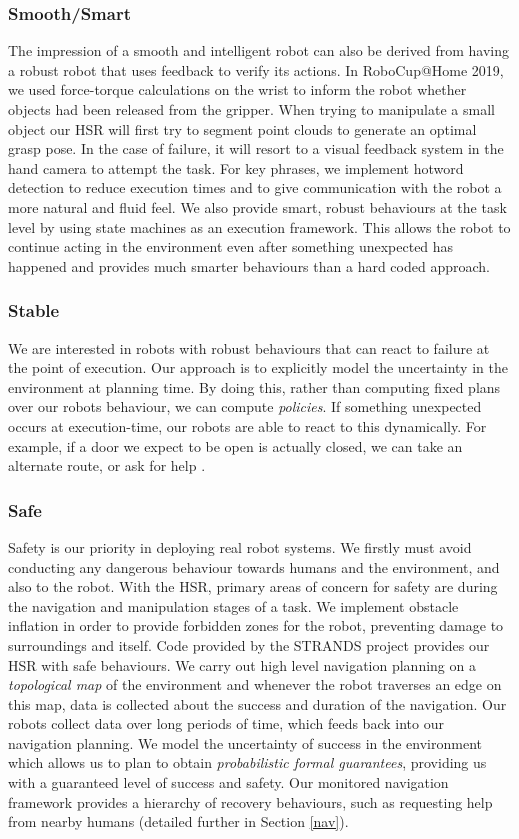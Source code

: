 \documentclass[runningheads,a4paper]{llncs}
\begin{document}
\subsubsection{Smooth/Smart}
The impression of a smooth and intelligent robot can also be derived from having a robust robot that uses feedback to verify its actions. In RoboCup@Home 2019, we used force-torque calculations on the wrist to inform the robot whether objects had been released from the gripper. When trying to manipulate a small object our HSR will first try to segment point clouds to generate an optimal grasp pose. In the case of failure, it will resort to a visual feedback system in the hand camera to attempt the task. For key phrases, we implement hotword detection to reduce execution times and to give communication with the robot a more natural and fluid feel. We also provide smart, robust behaviours at the task level by using state machines as an execution framework. This allows the robot to continue acting in the environment even after something unexpected has happened and provides much smarter behaviours than a hard coded approach.

\subsubsection{Stable}
We are interested in robots with robust behaviours that can react to failure at the point of execution. Our approach is to explicitly model the uncertainty in the environment at planning time. By doing this, rather than computing fixed plans over our robots behaviour, we can compute \emph{policies}. If something unexpected occurs at execution-time, our robots are able to react to this dynamically. For example, if a door we expect to be open is actually closed, we can take an alternate route, or ask for help \cite{lacerda2019probabilistic}.

\subsubsection{Safe}
Safety is our priority in deploying real robot systems. We firstly must avoid conducting any dangerous behaviour towards humans and the environment, and also to the robot. With the HSR, primary areas of concern for safety are during the navigation and manipulation stages of a task. We implement obstacle inflation in order to provide forbidden zones for the robot, preventing damage to surroundings and itself. Code provided by the STRANDS project provides our HSR with safe behaviours. We carry out high level navigation planning on a \emph{topological map} of the environment and whenever the robot traverses an edge on this map, data is collected about the success and duration of the navigation. Our robots collect data over long periods of time, which feeds back into our navigation planning. We model the uncertainty of success in the environment which allows us to plan to obtain \emph{probabilistic formal guarantees}, providing us with a guaranteed level of success and safety. Our monitored navigation framework provides a hierarchy of recovery behaviours, such as requesting help from nearby humans (detailed further in Section \ref{nav}).
\end{document}
